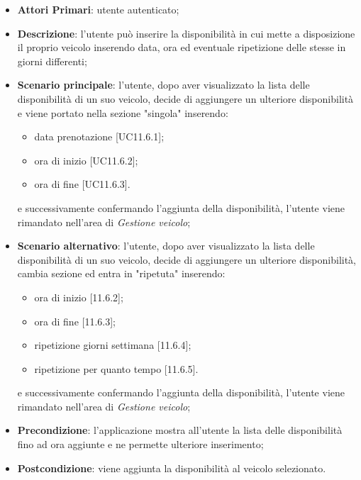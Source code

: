\begin{itemize}
	\item \textbf{Attori Primari}: utente autenticato;
	\item \textbf{Descrizione}: l'utente può inserire la disponibilità in cui mette a disposizione il proprio veicolo inserendo data, ora ed eventuale ripetizione delle stesse in giorni differenti;
	\item \textbf{Scenario principale}: l'utente, dopo aver visualizzato la lista delle disponibilità di un suo veicolo, decide di aggiungere un ulteriore disponibilità e viene portato nella sezione "singola" inserendo:
	\begin{itemize}
		\item data prenotazione [UC11.6.1];
		\item ora di inizio [UC11.6.2];
		\item ora di fine [UC11.6.3].
	\end{itemize}
	e successivamente confermando l'aggiunta della disponibilità, l'utente viene rimandato nell'area di \textit{Gestione veicolo};
	\item \textbf{Scenario alternativo}: l'utente, dopo aver visualizzato la lista delle disponibilità di un suo veicolo, decide di aggiungere un ulteriore disponibilità, cambia sezione ed entra in "ripetuta" inserendo:
	\begin{itemize}
		\item ora di inizio [11.6.2];
		\item ora di fine [11.6.3];
		\item ripetizione giorni settimana [11.6.4];
		\item ripetizione per quanto tempo [11.6.5].
	\end{itemize}
	e successivamente confermando l'aggiunta della disponibilità, l'utente viene rimandato nell'area di \textit{Gestione veicolo};
	\item \textbf{Precondizione}: l'applicazione mostra all'utente la lista delle disponibilità fino ad ora aggiunte e ne permette ulteriore inserimento;
	\item \textbf{Postcondizione}: viene aggiunta la disponibilità al veicolo selezionato.
\end{itemize}

